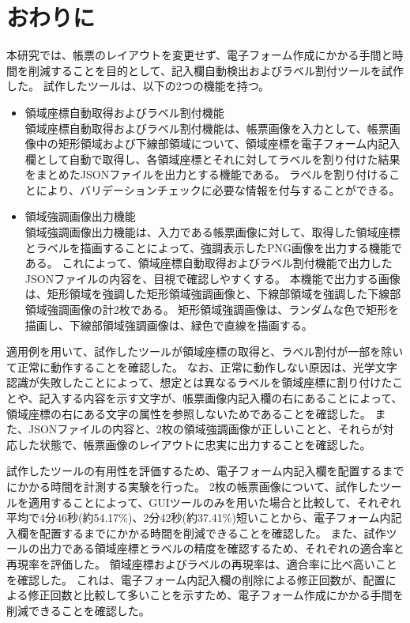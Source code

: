 \chapter{おわりに}\label{cha:Conclusion}
本研究では、帳票のレイアウトを変更せず、電子フォーム作成にかかる手間と時間を削減することを目的として、記入欄自動検出およびラベル割付ツールを試作した。
試作したツールは、以下の2つの機能を持つ。

\begin{itemize}
  \item 領域座標自動取得およびラベル割付機能\\
      領域座標自動取得およびラベル割付機能は、帳票画像を入力として、帳票画像中の矩形領域および下線部領域について、領域座標を電子フォーム内記入欄として自動で取得し、各領域座標とそれに対してラベルを割り付けた結果をまとめたJSONファイルを出力とする機能である。
      ラベルを割り付けることにより、バリデーションチェックに必要な情報を付与することができる。
  \item 領域強調画像出力機能\\
      領域強調画像出力機能は、入力である帳票画像に対して、取得した領域座標とラベルを描画することによって、強調表示したPNG画像を出力する機能である。
      これによって、領域座標自動取得およびラベル割付機能で出力したJSONファイルの内容を、目視で確認しやすくする。
      本機能で出力する画像は、矩形領域を強調した矩形領域強調画像と、下線部領域を強調した下線部領域強調画像の計2枚である。
      矩形領域強調画像は、ランダムな色で矩形を描画し、下線部領域強調画像は、緑色で直線を描画する。
\end{itemize}

適用例を用いて、試作したツールが領域座標の取得と、ラベル割付が一部を除いて正常に動作することを確認した。
なお、正常に動作しない原因は、光学文字認識が失敗したことによって、想定とは異なるラベルを領域座標に割り付けたことや、記入する内容を示す文字が、帳票画像内記入欄の右にあることによって、領域座標の右にある文字の属性を参照しないためであることを確認した。
また、JSONファイルの内容と、2枚の領域強調画像が正しいことと、それらが対応した状態で、帳票画像のレイアウトに忠実に出力することを確認した。

試作したツールの有用性を評価するため、電子フォーム内記入欄を配置するまでにかかる時間を計測する実験を行った。
2枚の帳票画像について、試作したツールを適用することによって、GUIツールのみを用いた場合と比較して、それぞれ平均で4分46秒(約54.17\%)、2分42秒(約37.41\%)短いことから、電子フォーム内記入欄を配置するまでにかかる時間を削減できることを確認した。
また、試作ツールの出力である領域座標とラベルの精度を確認するため、それぞれの適合率と再現率を評価した。
領域座標およびラベルの再現率は、適合率に比べ高いことを確認した。
これは、電子フォーム内記入欄の削除による修正回数が、配置による修正回数と比較して多いことを示すため、電子フォーム作成にかかる手間を削減できることを確認した。

